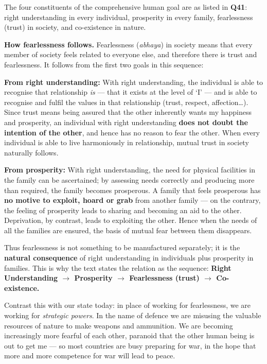\ans The four constituents of the comprehensive human goal are as listed in
\textbf{Q41}: right understanding in every individual, prosperity in every
family, fearlessness (trust) in society, and co-existence in nature.

\textbf{How fearlessness follows.} Fearlessness (\emph{abhaya}) in society
means that every member of society feels related to everyone else, and
therefore there is trust and fearlessness. It follows from the first two goals
in this sequence:

\begin{abul}
\item \textbf{From right understanding:} With right understanding, the
      individual is able to recognise that relationship \emph{is} --- that it
      exists at the level of `I' --- and is able to recognise and fulfil the
      values in that relationship (trust, respect, affection\ldots). Since
      trust means being assured that the other inherently wants my happiness
      and prosperity, an individual with right understanding \textbf{does not
      doubt the intention of the other}, and hence has no reason to fear the
      other. When every individual is able to live harmoniously in
      relationship, mutual trust in society naturally follows.
\item \textbf{From prosperity:} With right understanding, the need for
      physical facilities in the family can be ascertained; by assessing needs
      correctly and producing more than required, the family becomes
      prosperous. A family that feels prosperous has \textbf{no motive to
      exploit, hoard or grab} from another family --- on the contrary, the
      feeling of prosperity leads to sharing and becoming an aid to the other.
      Deprivation, by contrast, leads to exploiting the other. Hence when the
      needs of all the families are ensured, the basis of mutual fear between
      them disappears.
\end{abul}

Thus fearlessness is not something to be manufactured separately; it is the
\textbf{natural consequence} of right understanding in individuals plus
prosperity in families. This is why the text states the relation as the
sequence: \textbf{Right Understanding $\rightarrow$ Prosperity $\rightarrow$
Fearlessness (trust) $\rightarrow$ Co-existence.}

Contrast this with our state today: in place of working for fearlessness, we
are working for \emph{strategic powers}. In the name of defence we are
misusing the valuable resources of nature to make weapons and ammunition. We
are becoming increasingly more fearful of each other, paranoid that the other
human being is out to get me --- so most countries are busy preparing for war,
in the hope that more and more competence for war will lead to peace.


